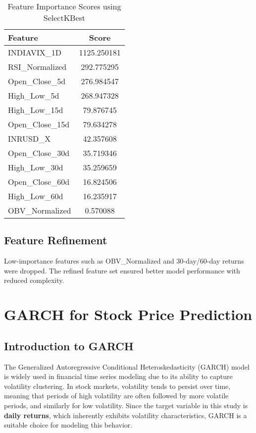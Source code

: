 \begin{table}[h!]
\centering
\caption{Feature Importance Scores using SelectKBest}
\begin{tabular}{|l|c|}
\hline
\textbf{Feature} & \textbf{Score} \\ \hline
INDIAVIX\_1D     & 1125.250181    \\ \hline
RSI\_Normalized  & 292.775295     \\ \hline
Open\_Close\_5d  & 276.984547     \\ \hline
High\_Low\_5d    & 268.947328     \\ \hline
High\_Low\_15d   & 79.876745      \\ \hline
Open\_Close\_15d & 79.634278      \\ \hline
INRUSD\_X        & 42.357608      \\ \hline
Open\_Close\_30d & 35.719346      \\ \hline
High\_Low\_30d   & 35.259659      \\ \hline
Open\_Close\_60d & 16.824506      \\ \hline
High\_Low\_60d   & 16.235917      \\ \hline
OBV\_Normalized  & 0.570088       \\ \hline
\end{tabular}

\label{tab:feature_importance}
\end{table}

\subsection{Feature Refinement}
Low-importance features such as OBV\_Normalized and 30-day/60-day returns were dropped. The refined feature set ensured better model performance with reduced complexity.

\section{GARCH for Stock Price Prediction}

\subsection{Introduction to GARCH}

The Generalized Autoregressive Conditional Heteroskedasticity (GARCH) model is widely used in financial time series modeling due to its ability to capture volatility clustering. In stock markets, volatility tends to persist over time, meaning that periods of high volatility are often followed by more volatile periods, and similarly for low volatility. Since the target variable in this study is \textbf{daily returns}, which inherently exhibits volatility characteristics, GARCH is a suitable choice for modeling this behavior.

